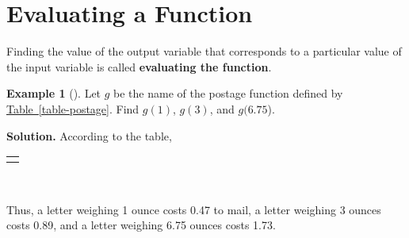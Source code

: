\documentclass[10pt,]{book}
\newcommand{\terminology}[1]{\textbf{#1}}
\theoremstyle{plain}
\theoremstyle{definition}
\theoremstyle{definition}
\theoremstyle{definition}
\newtheorem{example}[theorem]{Example}
\theoremstyle{definition}
\numberwithin{equation}{section}
\newlength{\panelmax}
\let\oldsection\section
\renewcommand\section{\znewpage\oldsection}
\begin{document}
\section[{Evaluating a Function}]{Evaluating a Function}\label{subsection-6}
\hypertarget{p-55}{}%
Finding the value of the output variable that corresponds to a particular value of the input variable is called \terminology{evaluating the function}.%
\begin{example}[]\label{example-postage2}
\hypertarget{p-56}{}%
Let \(g\) be the name of the postage function defined by \hyperref[table-postage]{Table~\ref{table-postage}}. Find \(g(1)\), \(g(3)\), and \(g(6.75\)).%
\par\smallskip%
\noindent\textbf{Solution.}\hypertarget{solution-2}{}\quad%
\hypertarget{p-57}{}%
According to the table,%
\par
\hypertarget{p-58}{}%
{%
\setlength{\panelmax}{0pt}
\ifdefined\panelboxAtabular\else\newsavebox{\panelboxAtabular}\fi%
\ifdefined\phAtabular\else\newlength{\phAtabular}\fi%
\setlength{\phAtabular}{\ht\panelboxAtabular+\dp\panelboxAtabular}
\settototalheight{\phAtabular}{\usebox{\panelboxAtabular}}
\setlength{\panelmax}{\maxof{\panelmax}{\phAtabular}}
\leavevmode%
\setlength{\tabcolsep}{0\linewidth}
\par\medskip\noindent
\begin{tabular}{@{}*{1}{c}@{}}
\begin{minipage}[c][\panelmax][t]{1\linewidth}\usebox{\panelboxAtabular}\end{minipage}\end{tabular}\\
}%
 Thus, a letter weighing 1 ounce costs \textdollar{}0.47 to mail, a letter weighing 3 ounces costs \textdollar{}0.89, and a letter weighing 6.75 ounces costs \textdollar{}1.73.%
\end{example}
\end{document}
